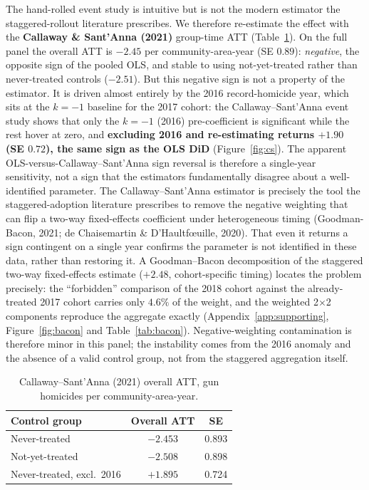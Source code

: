\documentclass[12pt]{article}
\begin{document}
The hand-rolled event study is intuitive but is not the modern estimator the
staggered-rollout literature prescribes. We therefore re-estimate the effect with
the \textbf{Callaway \& Sant'Anna (2021)} group-time ATT
(Table~\ref{tab:cs}). On the full panel the overall ATT is $-2.45$ per
community-area-year (SE $0.89$): \emph{negative}, the opposite sign of the pooled OLS,
and stable to using not-yet-treated rather than never-treated controls ($-2.51$). But
this negative sign is not a property of the estimator. It is driven almost entirely by
the 2016 record-homicide year, which sits at the $k = -1$ baseline for the 2017 cohort:
the Callaway--Sant'Anna event study shows that only the $k = -1$ (2016) pre-coefficient is significant while
the rest hover at zero, and \textbf{excluding 2016 and re-estimating returns $+1.90$ (SE
$0.72$), the same sign as the OLS DiD} (Figure~\ref{fig:cs}). The apparent
OLS-versus-Callaway--Sant'Anna sign reversal is therefore a single-year sensitivity, not
a sign that the estimators fundamentally disagree about a well-identified parameter. The
Callaway--Sant'Anna estimator is precisely the tool the staggered-adoption literature
prescribes to remove the negative weighting that can flip a two-way fixed-effects
coefficient under heterogeneous timing (Goodman-Bacon, 2021; de Chaisemartin \&
D'Haultf\oe uille, 2020). That even it returns a sign contingent on a single year confirms
the parameter is not identified in these data, rather than restoring it. A
Goodman--Bacon decomposition of the staggered two-way fixed-effects estimate ($+2.48$,
cohort-specific timing) locates the problem precisely: the ``forbidden'' comparison of
the 2018 cohort against the already-treated 2017 cohort carries only $4.6\%$ of the
weight, and the weighted 2$\times$2 components reproduce the aggregate exactly
(Appendix~\ref{app:supporting}, Figure~\ref{fig:bacon} and Table~\ref{tab:bacon}). Negative-weighting contamination is therefore minor in this
panel; the instability comes from the 2016 anomaly and the absence of a valid control
group, not from the staggered aggregation itself.

\begin{table}[H]
\centering
\small
\caption{Callaway--Sant'Anna (2021) overall ATT, gun homicides per community-area-year.}
\label{tab:cs}
\begin{tabular}{lcc}
\toprule
Control group & Overall ATT & SE \\
\midrule
Never-treated                 & $-2.453$ & 0.893 \\
Not-yet-treated               & $-2.508$ & 0.898 \\
Never-treated, excl.\ 2016    & $+1.895$ & 0.724 \\
\bottomrule
\end{tabular}
\end{table}
\end{document}
